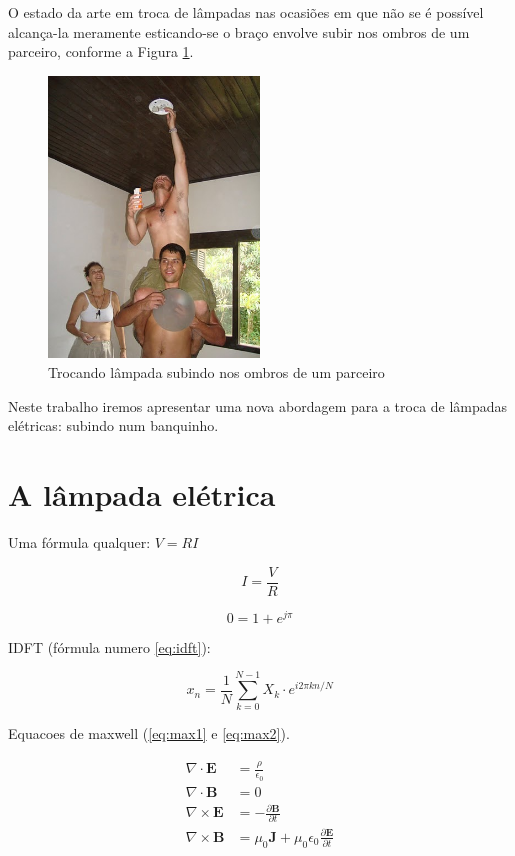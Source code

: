 \documentclass{report}
\newcommand{\vetor}[1]{\textbf{#1}}
\begin{document}
O estado da arte em troca de lâmpadas nas ocasiões em que não se é possível
alcança-la meramente esticando-se o braço envolve subir nos ombros de um parceiro,
conforme a Figura \ref{fig:ombros}.

\begin{figure}[!htb]
  \centering
  \includegraphics[width=0.5\textwidth]{ombros.jpg}
  \caption{Trocando lâmpada subindo nos ombros de um parceiro}
  \label{fig:ombros}
\end{figure}


Neste trabalho iremos apresentar uma nova abordagem
para a troca de lâmpadas elétricas:
subindo num banquinho. %


\chapter{A lâmpada elétrica}
\label{sec:alampada}

Uma fórmula qualquer: $V=R I$

$$I = \frac{V}{R}$$

$$0=1+e^{j\pi}$$

IDFT (fórmula numero \ref{eq:idft}):

\begin{equation}
\label{eq:idft}
x_n = \frac{1}{N}
\sum_{k=0}^{N-1} X_k \cdot
e^{i2\pi kn/N}
\end{equation}

Equacoes de maxwell (\ref{eq:max1} e \ref{eq:max2}).

\begin{align}
\label{eq:max1}
\nabla \cdot \vetor{E} & = \frac{\rho}{\epsilon_0} \\
\label{eq:max2}
\nabla \cdot \vetor{B} & = 0 \\
\nabla \times \vetor{E}
& = - \frac{\partial \vetor{B}}{\partial t} \\
\nabla \times \vetor{B} & =
\mu_0\vetor{J} + \mu_0 \epsilon_0
\frac{\partial \vetor{E}}{\partial t}
\end{align}
\end{document}
